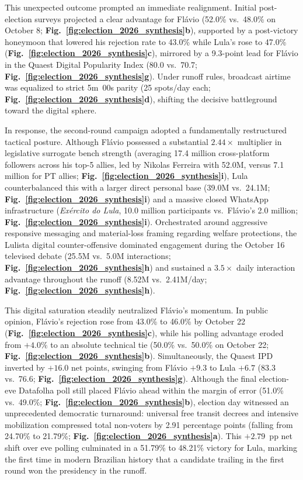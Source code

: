 \documentclass{article}
\begin{document}
This unexpected outcome prompted an immediate realignment. Initial post-election surveys projected a clear advantage for Fl\'avio (52.0\% vs.\ 48.0\% on October 8; \textbf{Fig.~\ref{fig:election_2026_synthesis}b}), supported by a post-victory honeymoon that lowered his rejection rate to 43.0\% while Lula's rose to 47.0\% (\textbf{Fig.~\ref{fig:election_2026_synthesis}c}), mirrored by a 9.3-point lead for Fl\'avio in the Quaest Digital Popularity Index (80.0 vs.\ 70.7; \textbf{Fig.~\ref{fig:election_2026_synthesis}g}). Under runoff rules, broadcast airtime was equalized to strict 5m~00s parity (25 spots/day each; \textbf{Fig.~\ref{fig:election_2026_synthesis}d}), shifting the decisive battleground toward the digital sphere.

In response, the second-round campaign adopted a fundamentally restructured tactical posture. Although Fl\'avio possessed a substantial $2.44\times$ multiplier in legislative surrogate bench strength (averaging 17.4 million cross-platform followers across his top-5 allies, led by Nikolas Ferreira with 52.0M, versus 7.1 million for PT allies; \textbf{Fig.~\ref{fig:election_2026_synthesis}i}), Lula counterbalanced this with a larger direct personal base (39.0M vs.\ 24.1M; \textbf{Fig.~\ref{fig:election_2026_synthesis}i}) and a massive closed WhatsApp infrastructure (\emph{Ex\'ercito do Lula}, 10.0 million participants vs.\ Fl\'avio's 2.0 million; \textbf{Fig.~\ref{fig:election_2026_synthesis}i}). Orchestrated around aggressive responsive messaging and material-loss framing regarding welfare protections, the Lulista digital counter-offensive dominated engagement during the October 16 televised debate (25.5M vs.\ 5.0M interactions; \textbf{Fig.~\ref{fig:election_2026_synthesis}h}) and sustained a $3.5\times$ daily interaction advantage throughout the runoff (8.52M vs.\ 2.41M/day; \textbf{Fig.~\ref{fig:election_2026_synthesis}h}).

This digital saturation steadily neutralized Fl\'avio's momentum. In public opinion, Fl\'avio's rejection rose from 43.0\% to 46.0\% by October 22 (\textbf{Fig.~\ref{fig:election_2026_synthesis}c}), while his polling advantage eroded from $+4.0\%$ to an absolute technical tie (50.0\% vs.\ 50.0\% on October 22; \textbf{Fig.~\ref{fig:election_2026_synthesis}b}). Simultaneously, the Quaest IPD inverted by $+16.0$ net points, swinging from Fl\'avio $+9.3$ to Lula $+6.7$ (83.3 vs.\ 76.6; \textbf{Fig.~\ref{fig:election_2026_synthesis}g}). Although the final election-eve Datafolha poll still placed Fl\'avio ahead within the margin of error (51.0\% vs.\ 49.0\%; \textbf{Fig.~\ref{fig:election_2026_synthesis}b}), election day witnessed an unprecedented democratic turnaround: universal free transit decrees and intensive mobilization compressed total non-voters by 2.91 percentage points (falling from 24.70\% to 21.79\%; \textbf{Fig.~\ref{fig:election_2026_synthesis}a}). This $+2.79$~pp net shift over eve polling culminated in a 51.79\% to 48.21\% victory for Lula, marking the first time in modern Brazilian history that a candidate trailing in the first round won the presidency in the runoff.
\end{document}

